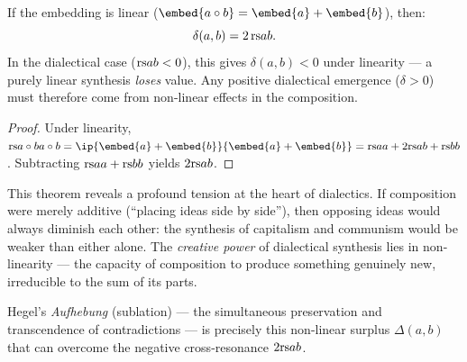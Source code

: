 \begin{theorem}
\label{thm:dialectical-cross}
If the embedding is linear ($\embed{a \compose b} = \embed{a} + \embed{b}$),
then:
\[
  \delta(a, b) = 2\,\mathrm{rs}{a}{b}.
\]
In the dialectical case ($\mathrm{rs}{a}{b} < 0$), this gives $\delta(a, b) < 0$
under linearity --- a purely linear synthesis \emph{loses} value.  Any
positive dialectical emergence ($\delta > 0$) must therefore come from
non-linear effects in the composition.
\end{theorem}

\begin{proof}
Under linearity, $\rs{a \compose b}{a \compose b} = \ip{\embed{a} +
\embed{b}}{\embed{a} + \embed{b}} = \rs{a}{a} + 2\rs{a}{b} + \rs{b}{b}$.
Subtracting $\mathrm{rs}{a}{a} + \mathrm{rs}{b}{b}$ yields $2\mathrm{rs}{a}{b}$.
\end{proof}

\begin{interpretation}
This theorem reveals a profound tension at the heart of dialectics.  If
composition were merely additive (``placing ideas side by side''), then
opposing ideas would always diminish each other: the synthesis of capitalism
and communism would be weaker than either alone.  The \emph{creative power}
of dialectical synthesis lies in non-linearity --- the capacity of composition
to produce something genuinely new, irreducible to the sum of its parts.

Hegel's \emph{Aufhebung} (sublation) --- the simultaneous preservation and
transcendence of contradictions --- is precisely this non-linear surplus
$\Delta(a,b)$ that can overcome the negative cross-resonance $2\mathrm{rs}{a}{b}$.
\end{interpretation}

